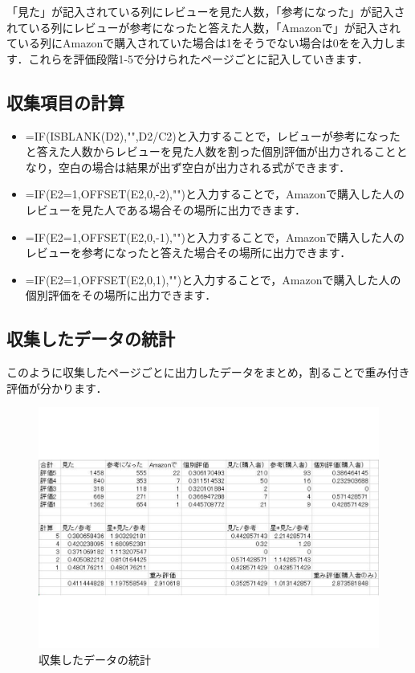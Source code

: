 「見た」が記入されている列にレビューを見た人数，「参考になった」が記入されている列にレビューが参考になったと答えた人数，「Amazonで」が記入されている列にAmazonで購入されていた場合は1をそうでない場合は0をを入力します．これらを評価段階1-5で分けられたページごとに記入していきます．

\subsection{収集項目の計算}

\begin{itemize}
\setlength{\parskip}{3mm}

 \item	{=IF(ISBLANK(D2),"",D2/C2)}と入力することで，レビューが参考になったと答えた人数からレビューを見た人数を割った個別評価が出力されることとなり，空白の場合は結果が出ず空白が出力される式ができます．


 \item	{=IF(E2=1,OFFSET(E2,0,-2),"")}と入力することで，Amazonで購入した人のレビューを見た人である場合その場所に出力できます．

 \item	{=IF(E2=1,OFFSET(E2,0,-1),"")}と入力することで，Amazonで購入した人のレビューを参考になったと答えた場合その場所に出力できます．

 \item	{=IF(E2=1,OFFSET(E2,0,1),"")}と入力することで，Amazonで購入した人の個別評価をその場所に出力できます．


\end{itemize}


\subsection{収集したデータの統計}

このように収集したページごとに出力したデータをまとめ，割ることで重み付き評価が分かります．


\begin{figure}[htbp]

\centering
\includegraphics[width=12cm,clip]{ekuseru2.pdf}
\caption{収集したデータの統計}
\label{ekuseru2}

\end{figure}

